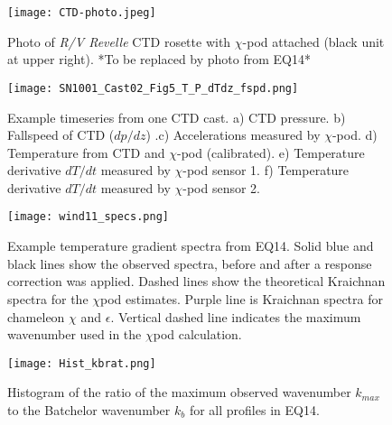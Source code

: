 \documentclass{ametsoc}
\begin{document}
%

\begin{figure}[t]
  \noindent\texttt{[image: CTD-photo.jpeg]}\\
  \caption{Photo of \textit{R/V Revelle} CTD rosette with $\chi$-pod attached (black unit at upper right). *To be replaced by photo from EQ14*}
  \label{f1}
\end{figure}

\begin{figure}[t]
  \noindent\texttt{[image: SN1001\_Cast02\_Fig5\_T\_P\_dTdz\_fspd.png]}\\
  \caption{Example timeseries from one CTD cast. a) CTD pressure. b) Fallspeed of CTD ($dp/dz$) .c) Accelerations measured by $\chi$-pod. d) Temperature from CTD and $\chi$-pod (calibrated). e) Temperature derivative $dT/dt$ measured by $\chi$-pod sensor 1. f) Temperature derivative $dT/dt$ measured by $\chi$-pod sensor 2.}
  \label{f2}
\end{figure}


\begin{figure}[t]
  \noindent\texttt{[image: wind11\_specs.png]}\\
  \caption{Example temperature gradient spectra from EQ14. Solid blue and black lines show the observed spectra, before and after a response correction was applied. Dashed lines show the theoretical Kraichnan spectra for the $\chi$pod estimates. Purple line is Kraichnan spectra for chameleon $\chi$ and $\epsilon$. Vertical dashed line indicates the maximum wavenumber used in the $\chi$pod calculation.}
  \label{specexamp}
\end{figure}


\begin{figure}[t]
  \noindent\texttt{[image: Hist\_kbrat.png]}\\
  \caption{Histogram of the ratio of the maximum observed wavenumber $k_{max}$ to the Batchelor wavenumber $k_b$ for all profiles in EQ14.}
  \label{histkbrat}
\end{figure}
\end{document}
